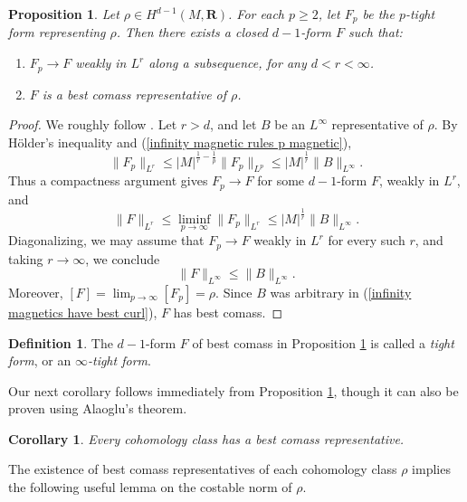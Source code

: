 \documentclass[reqno,11pt]{amsart}
\newcommand{\RR}{\mathbf{R}}
\newcommand{\dfn}[1]{\emph{#1}\index{#1}}
\newtheorem{proposition}[theorem]{Proposition}
\newtheorem{corollary}[theorem]{Corollary}
\theoremstyle{definition}
\newtheorem{definition}[theorem]{Definition}
\numberwithin{equation}{section}
\begin{document}
\begin{proposition}\label{existence infinity}
Let $\rho \in H^{d - 1}(M, \RR)$.
For each $p \geq 2$, let $F_p$ be the $p$-tight form representing $\rho$. Then there exists a closed $d - 1$-form $F$ such that:
\begin{enumerate}
\item $F_p \to F$ weakly in $L^r$ along a subsequence, for any $d < r < \infty$.
\item $F$ is a best comass representative of $\rho$.
\end{enumerate}
\end{proposition}
\begin{proof}
We roughly follow \cite[\S3]{Lindqvist14}.
Let $r > d$, and let $B$ be an $L^\infty$ representative of $\rho$.
By H\"older's inequality and (\ref{infinity magnetic rules p magnetic}),
\begin{equation}\label{uniform bounds in p by best curl}
	\|F_p\|_{L^r} \leq |M|^{\frac{1}{r} - \frac{1}{p}} \|F_p\|_{L^p} \leq |M|^{\frac{1}{r}} \|B\|_{L^\infty}.
\end{equation}
Thus a compactness argument gives $F_p \to F$ for some $d - 1$-form $F$, weakly in $L^r$, and 
$$\|F\|_{L^r} \leq \liminf_{p \to \infty} \|F_p\|_{L^r} \leq |M|^{\frac{1}{r}} \|B\|_{L^\infty}.$$
Diagonalizing, we may assume that $F_p \to F$ weakly in $L^r$ for every such $r$, and taking $r \to \infty$, we conclude 
\begin{equation}\label{infinity magnetics have best curl}
	\|F\|_{L^\infty} \leq \|B\|_{L^\infty}.
\end{equation}
Moreover, $[F] = \lim_{p \to \infty} [F_p] = \rho$.
Since $B$ was arbitrary in (\ref{infinity magnetics have best curl}), $F$ has best comass.
\end{proof}

\begin{definition}
The $d - 1$-form $F$ of best comass in Proposition \ref{existence infinity} is called a \dfn{tight form}, or an \dfn{$\infty$-tight form}.
\end{definition}

Our next corollary follows immediately from Proposition \ref{existence infinity}, though it can also be proven using Alaoglu's theorem.

\begin{corollary}
Every cohomology class has a best comass representative.
\end{corollary}

The existence of best comass representatives of each cohomology class $\rho$ implies the following useful lemma on the costable norm of $\rho$.
\end{document}
